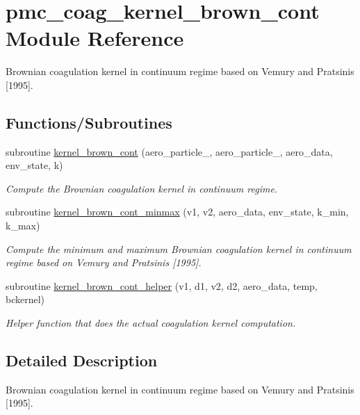 \hypertarget{namespacepmc__coag__kernel__brown__cont}{}\section{pmc\+\_\+coag\+\_\+kernel\+\_\+brown\+\_\+cont Module Reference}
\label{namespacepmc__coag__kernel__brown__cont}


Brownian coagulation kernel in continuum regime based on Vemury and Pratsinis \mbox{[}1995\mbox{]}.  


\subsection*{Functions/\+Subroutines}
\begin{DoxyCompactItemize}
\item 
subroutine \mbox{\hyperlink{namespacepmc__coag__kernel__brown__cont_abcd2f47ef31e60a8f1446fef30a69306}{kernel\+\_\+brown\+\_\+cont}} (aero\+\_\+particle\+\_, aero\+\_\+particle\+\_, aero\+\_\+data, env\+\_\+state, k)
\begin{DoxyCompactList}\small\item\em Compute the Brownian coagulation kernel in continuum regime. \end{DoxyCompactList}\item 
subroutine \mbox{\hyperlink{namespacepmc__coag__kernel__brown__cont_a4e0c382e477955188e558f4feeefce74}{kernel\+\_\+brown\+\_\+cont\+\_\+minmax}} (v1, v2, aero\+\_\+data, env\+\_\+state, k\+\_\+min, k\+\_\+max)
\begin{DoxyCompactList}\small\item\em Compute the minimum and maximum Brownian coagulation kernel in continuum regime based on Vemury and Pratsinis \mbox{[}1995\mbox{]}. \end{DoxyCompactList}\item 
subroutine \mbox{\hyperlink{namespacepmc__coag__kernel__brown__cont_a7e5d5ce90516da22eb41dfbf20cf8efe}{kernel\+\_\+brown\+\_\+cont\+\_\+helper}} (v1, d1, v2, d2, aero\+\_\+data, temp, bckernel)
\begin{DoxyCompactList}\small\item\em Helper function that does the actual coagulation kernel computation. \end{DoxyCompactList}\end{DoxyCompactItemize}


\subsection{Detailed Description}
Brownian coagulation kernel in continuum regime based on Vemury and Pratsinis \mbox{[}1995\mbox{]}. 

